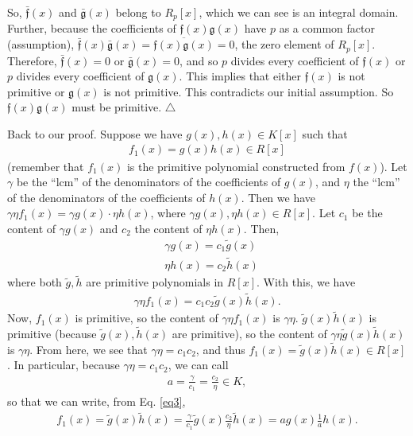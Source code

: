 \documentclass[12pt]{article}
\newcommand{\nn}{\nonumber}
\newcommand{\f}[2]{\frac{#1}{#2}}
\begin{document}
\begin{framed}
So, $\bar{\mathfrak{f}}(x)$ and $\bar{\mathfrak{g}}(x)$ belong to $R_p[x]$, which we can see is an integral domain. Further, because the coefficients of $\mathfrak{f}(x)\mathfrak{g}(x)$ have $p$ as a common factor (assumption), $\bar{\mathfrak{f}}(x)\bar{\mathfrak{g}}(x) = \overline{\mathfrak{f}(x)\mathfrak{g}(x)} = 0$, the zero element of $R_p[x]$. Therefore, $\bar{\mathfrak{f}}(x) = 0$ or $\bar{\mathfrak{g}}(x) = 0$, and so $p$ divides every coefficient of $\mathfrak{f}(x)$ or $p$ divides every coefficient of $\mathfrak{g}(x)$. This implies that either $\mathfrak{f}(x)$ is not primitive or $\mathfrak{g}(x)$ is not primitive. This contradicts our initial assumption. So $\mathfrak{f}(x)\mathfrak{g}(x)$ must be primitive. \hfill$\triangle$
\end{framed}


Back to our proof. Suppose we have $g(x),h(x) \in K[x]$ such that 
\begin{align*}
f_1(x) = g(x)h(x) \in R[x]
\end{align*}
(remember that $f_1(x)$ is the primitive polynomial constructed from $f(x)$). Let $\gamma$ be the ``lcm'' of the denominators of the coefficients of $g(x)$, and $\eta$ the ``lcm'' of the denominators of the coefficients of $h(x)$. Then we have $\gamma\eta f_1(x) = \gamma g(x) \cdot \eta h(x)$, where $\gamma g(x), \eta h(x) \in R[x]$. Let $c_1$ be the content of $\gamma g(x)$ and $c_2$ the content of $\eta h(x)$. Then,
\begin{align*}
&\gamma g(x) = c_1 \tilde{g}(x)\nn\\
&\eta h(x) = c_2 \tilde{h}(x)\nn
\end{align*}  
where both $\tilde{g},\tilde{h}$ are primitive polynomials in $R[x]$. With this, we have
\begin{align}\label{eq3}
\gamma \eta f_1(x) = c_1 c_2 \tilde{g}(x)\tilde{h}(x).
\end{align}
Now, $f_1(x)$ is primitive, so the content of $\gamma \eta f_1(x)$ is $\gamma \eta$. $\tilde{g}(x)\tilde{h}(x)$ is primitive (because $\tilde{g}(x),\tilde{h}(x)$ are primitive), so the content of $\gamma \eta \tilde{g}(x)\tilde{h}(x)$ is $\gamma\eta$. From here, we see that $\gamma \eta = c_1 c_2$, and thus $f_1(x) = \tilde{g}(x)\tilde{h}(x) \in R[x]$.  In particular, because $\gamma \eta = c_1 c_2$, we can call
\begin{align*}
a = \f{\gamma}{c_1} = \f{c_2}{\eta} \in K,
\end{align*}
so that we can write, from Eq. \eqref{eq3},
\begin{align*}
f_1(x) = \tilde{g}(x)\tilde{h}(x) =  \f{\gamma}{c_1} \tilde{g}(x) \f{c_2}{\eta}\tilde{h}(x) = a g(x) \f{1}{a}h(x).
\end{align*}
\end{document}
